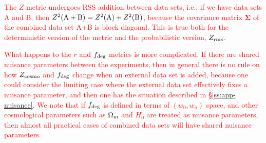 \documentclass[usenatbib]{mnras}
\newcommand{\changetext}[1]{\textcolor{red}{#1}}
\begin{document}
\changetext{The $Z$ metric undergoes RSS addition between data sets, i.e., if we have data sets A and B, then $Z^2({\rm A+B)} = Z^2({\rm A}) + Z^2({\rm B})$, because the covariance matrix ${\boldsymbol\Sigma}$ of the combined data set A+B is block diagonal. This is true both for the deterministic version of the metric and the probabilistic version, $Z_{\rm rms}$.}

\changetext{What happens to the $r$ and $f_{\rm deg}$ metrics is more complicated. If there are shared nuisance parameters between the experiments, then in general there is no rule on how $Z_{\rm cosmo}$ and $f_{\rm deg}$ change when an external data set is added, because one could consider the limiting case where the external data set effectively fixes a nuisance parameter, and then one has the situation described in \S\ref{ss:app-nuisance}. We note that if $f_{\rm deg}$ is defined in terms of $(w_0,w_a)$ space, and other cosmological parameters such as $\Omega_{\rm m}$ and $H_0$ are treated as nuisance parameters, then almost all practical cases of combined data sets will have shared nuisance parameters.}
\end{document}
